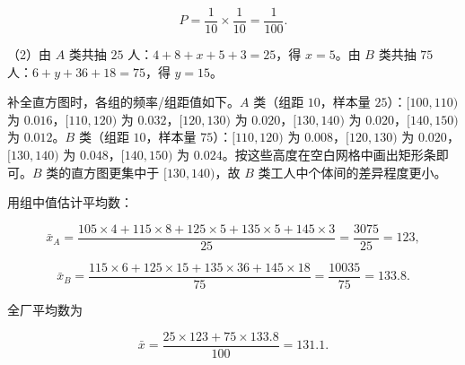 \begin{answer}
\nopagebreak[4]
\[P=\frac1{10}\times\frac1{10}=\frac1{100} .\]

（2）由 $A$ 类共抽 $25$ 人：$4+8+x+5+3=25$，得 $x=5$。由 $B$ 类共抽 $75$ 人：$6+y+36+18=75$，得 $y=15$。

补全直方图时，各组的频率/组距值如下。$A$ 类（组距 $10$，样本量 $25$）：$[100,110)$ 为 $0.016$，$[110,120)$ 为 $0.032$，$[120,130)$ 为 $0.020$，$[130,140)$ 为 $0.020$，$[140,150)$ 为 $0.012$。$B$ 类（组距 $10$，样本量 $75$）：$[110,120)$ 为 $0.008$，$[120,130)$ 为 $0.020$，$[130,140)$ 为 $0.048$，$[140,150)$ 为 $0.024$。按这些高度在空白网格中画出矩形条即可。$B$ 类的直方图更集中于 $[130,140)$，故 $B$ 类工人中个体间的差异程度更小。

用组中值估计平均数：

\nopagebreak[4]
\[\bar x_A=\frac{105\times4+115\times8+125\times5+135\times5+145\times3}{25}=\frac{3075}{25}=123,\]

\nopagebreak[4]
\[\bar x_B=\frac{115\times6+125\times15+135\times36+145\times18}{75}=\frac{10035}{75}=133.8 .\]

全厂平均数为

\nopagebreak[4]
\[\bar x=\frac{25\times123+75\times133.8}{100}=131.1 .\]


\end{answer}
